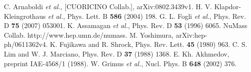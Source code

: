 \begin{thebibliography}{99}
C. Arnaboldi \textit{et al.}, [CUORICINO Collab.], arXiv:0802.3439v1.
H. V. Klapdor-Kleingrothaus \textit{et al.}, Phys. Lett. B \textbf{586} (2004) 198.
G. L. Fogli \textit{et al.}, Phys. Rev. D \textbf{75} (2007) 053001.
K. Assamagan \textit{et al.}, Phys. Rev. D \textbf{53} (1996) 6065.
NuMass Collab. http://www.hep.umn.de/numass.
 M. Yoshimura, arXiv:hep-ph/0611362v4.
 K. Fujikawa and R. Shrock, Phys. Rev. Lett. \textbf{45} (1980) 963.
C. S. Lim and W. J. Marciano, Phys. Rev. D \textbf{37} (1988) 1368.
E. Kh. Akhmedov, preprint IAE-4568/1 (1988).
W. Grimus \textit{et al.}, Nucl. Phys. B \textbf{648} (2002) 376.

\end{thebibliography}


